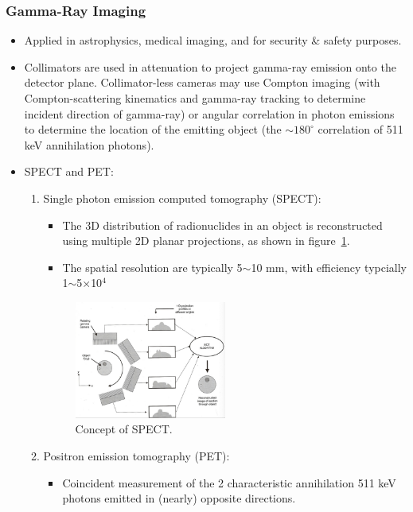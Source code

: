 \subsubsection{Gamma-Ray Imaging}
\begin{itemize}
    \item Applied in astrophysics, medical imaging, and for security \& safety purposes.
    \item Collimators are used in attenuation to project gamma-ray emission onto the detector plane. Collimator-less cameras may use Compton imaging (with Compton-scattering kinematics and gamma-ray tracking to determine incident direction of gamma-ray) or angular correlation in photon emissions to determine the location of the emitting object (the $\sim180^\circ$ correlation of 511 keV annihilation photons). 
    \item SPECT and PET:
    \begin{enumerate}
        \item Single photon emission computed tomography (SPECT):
        \begin{itemize}
            \item The 3D distribution of radionuclides in an object is reconstructed using multiple 2D planar projections, as shown in figure~\ref{fig:SPECT}.
            \item The spatial resolution are typically 5$\sim$10 mm, with efficiency typcially 1$\sim$5$\times$10$^4$
        \end{itemize}
        \begin{figure}[ht]
            \centering
            \includegraphics[width=0.5\textwidth]{images/SPECT.png}
            \caption{Concept of SPECT.}
            \label{fig:SPECT}
        \end{figure}
        \item Positron emission tomography (PET):
        \begin{itemize}
            \item Coincident measurement of the 2 characteristic annihilation 511 keV photons emitted in (nearly) opposite directions.

\end{itemize}
\end{enumerate}
\end{itemize}

